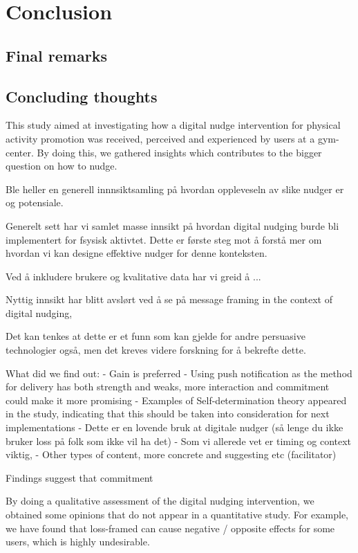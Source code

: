 \chapter{Conclusion} 

\section{Final remarks}

\section{Concluding thoughts}
This study aimed at investigating how a digital nudge intervention for physical activity promotion was received, perceived and experienced by users at a gym-center. By doing this, we gathered insights which contributes to the bigger question on how to nudge.



Ble heller en generell innnsiktsamling på hvordan oppleveseln av slike nudger er og potensiale. 

Generelt sett har vi samlet masse innsikt på hvordan digital nudging burde bli implementert for fsysisk aktivtet. Dette er første steg mot å forstå mer om hvordan vi kan designe effektive nudger for denne konteksten. 

Ved å inkludere brukere og kvalitative data har vi greid å ... 
 

Nyttig innsikt har blitt avslørt ved å se på message framing in the context of digital nudging, 

Det kan tenkes at dette er et funn som kan gjelde for andre persuasive technologier også, men det kreves videre forskning for å bekrefte dette. 

What did we find out:
- Gain is preferred 
- Using push notification as the method for delivery has both strength and weaks, more interaction and commitment could make it more promising
- Examples of Self-determination theory appeared in the study, indicating that this should be taken into consideration for next implementations
- Dette er en lovende bruk at digitale nudger (så lenge du ikke bruker loss på folk som ikke vil ha det)
- Som vi allerede vet er timing og context viktig, 
- Other types of content, more concrete and suggesting etc (facilitator)

Findings suggest that commitment 

By doing a qualitative assessment of the digital nudging intervention, we obtained some opinions that do not appear in a quantitative study. For example, we have found that loss-framed can cause negative / opposite effects for some users, which is highly undesirable. 

